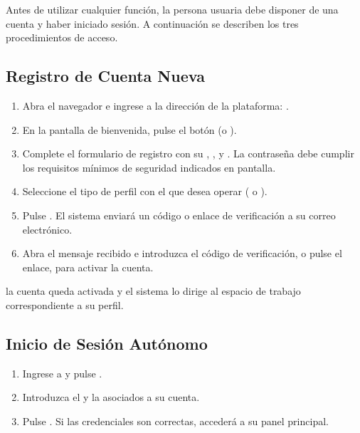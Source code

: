 Antes de utilizar cualquier función, la persona usuaria debe disponer de una cuenta y
haber iniciado sesión. A continuación se describen los tres procedimientos de acceso.

\subsection{Registro de Cuenta Nueva}
\label{subsec:registro}

\begin{enumerate}[noitemsep]
    \item Abra el navegador e ingrese a la dirección de la plataforma:
    .
    \item En la pantalla de bienvenida, pulse el botón  (o
    ).
    \item Complete el formulario de registro con su , ,
     y . La contraseña debe cumplir los
    requisitos mínimos de seguridad indicados en pantalla.
    \item Seleccione el tipo de perfil con el que desea operar ( o
    ).
    \item Pulse . El sistema enviará un código o enlace de
    verificación a su correo electrónico.
    \item Abra el mensaje recibido e introduzca el código de verificación, o pulse el
    enlace, para activar la cuenta.
\end{enumerate}

 la cuenta queda activada y el sistema lo dirige al
espacio de trabajo correspondiente a su perfil.

\subsection{Inicio de Sesión Autónomo}
\label{subsec:login}

\begin{enumerate}[noitemsep]
    \item Ingrese a  y pulse .
    \item Introduzca el  y la  asociados a
    su cuenta.
    \item Pulse . Si las credenciales son correctas, accederá a su panel
    principal.
\end{enumerate}

